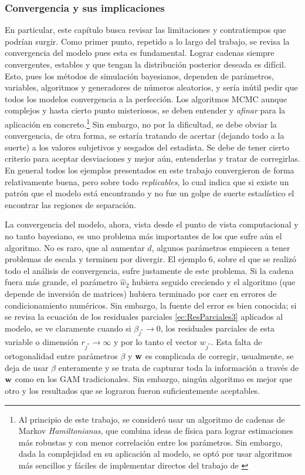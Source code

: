 \documentclass[../Main/Main.tex]{subfiles}
\begin{document}
\subsubsection*{Convergencia y sus implicaciones}
En particular, este capítulo busca revisar las limitaciones y contratiempos que podrían surgir. Como primer punto, repetido a lo largo del trabajo, se revisa la convergencia del modelo pues esta es fundamental. Lograr cadenas siempre convergentes, estables y que tengan la distribución posterior deseada es  difícil. Esto, pues los métodos de simulación bayesianos, dependen de parámetros, variables,  algoritmos y generadores de números aleatorios, y sería inútil pedir que todos los modelos convergencia a la perfección. Los algoritmos MCMC aunque complejos y hasta cierto punto misteriosos, se deben entender y \textit{afinar} para la aplicación en concreto.\footnote{Al principio de este trabajo, se consideró usar un algoritmo de cadenas de Markov \textit{Hamiltonianas}, que combina ideas de física para lograr estimaciones más robustas y con menor correlación entre los parámetros. Sin embargo, dada la complejidad en su aplicación al modelo, se optó por usar algoritmos más sencillos y fáciles de implementar directos del trabajo de \citet{albert1993bayesian}} Sin embargo, no por la dificultad, se debe obviar la convergencia, de otra forma, se estaría tratando de acertar (dejando todo a la suerte) a los valores subjetivos y sesgados del estadista. Se debe de tener cierto criterio para aceptar desviaciones y mejor aún, entenderlas y tratar de corregirlas. En general todos los ejemplos presentados en este trabajo convergieron de forma relativamente buena, pero sobre todo \textit{replicables}, lo cual indica que si existe un patrón que el modelo está encontrando y no fue un golpe de suerte estadístico el encontrar las regiones de separación. %

La convergencia del modelo, ahora, vista desde el punto de vista computacional y no tanto bayesiano, es uno problema más importantes de los que sufre aún el algoritmo. No es raro, que al aumentar $d$, algunos parámetros empiecen a tener problemas de escala y terminen por divergir. El ejemplo 6, sobre el que se realizó todo el análisis de convergencia, sufre justamente de este problema. Si la cadena fuera más grande, el parámetro $\hat{w}_2$ hubiera seguido creciendo y el algoritmo (que depende de inversión de matrices) hubiera terminado por caer en errores de condicionamiento numéricos. Sin embargo, la fuente del error es bien conocida; si se revisa la ecuación de los residuales parciales \ref{ec:ResParciales3} aplicados al modelo, se ve claramente cuando si $\beta_{j^*}\rightarrow0$, los residuales parciales de esta variable o dimensión $r_{j^*} \rightarrow \infty$ y por lo tanto el vector $w_{j^*}$. Esta falta de ortogonalidad entre parámetros $\beta$ y $\mathbf{w}$ es complicada de corregir, usualmente, se deja de usar $\beta$ enteramente y se trata de capturar toda la información a través de $\mathbf{w}$ como en los GAM tradicionales. Sin embargo, ningún algoritmo es mejor que otro y los resultados que se lograron fueron suficientemente aceptables.
\end{document}
